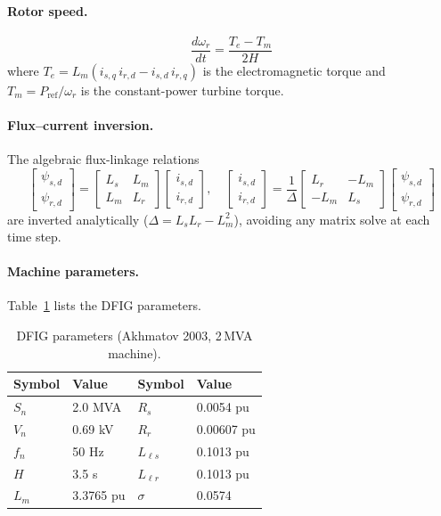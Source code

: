 \documentclass[11pt,a4paper]{article}
\begin{document}
\paragraph{Rotor speed.}
\begin{equation}
  \frac{d\omega_r}{dt} = \frac{T_e - T_m}{2H}
  \label{eq:wr}
\end{equation}
where $T_e = L_m(i_{s,q}\,i_{r,d} - i_{s,d}\,i_{r,q})$ is the
electromagnetic torque and $T_m = P_\text{ref}/\omega_r$ is the
constant-power turbine torque.

\paragraph{Flux–current inversion.}
The algebraic flux-linkage relations
\begin{equation}
  \begin{bmatrix}\psi_{s,d}\\\psi_{r,d}\end{bmatrix}
  = \begin{bmatrix}L_s & L_m\\ L_m & L_r\end{bmatrix}
  \begin{bmatrix}i_{s,d}\\i_{r,d}\end{bmatrix},
  \quad
  \begin{bmatrix}i_{s,d}\\i_{r,d}\end{bmatrix}
  = \frac{1}{\Delta}
  \begin{bmatrix}L_r & -L_m\\ -L_m & L_s\end{bmatrix}
  \begin{bmatrix}\psi_{s,d}\\\psi_{r,d}\end{bmatrix}
  \label{eq:flux_inv}
\end{equation}
are inverted analytically ($\Delta = L_s L_r - L_m^2$), avoiding
any matrix solve at each time step.

\paragraph{Machine parameters.}
Table~\ref{tab:params} lists the DFIG parameters.

\begin{table}[H]
  \centering
  \caption{DFIG parameters (Akhmatov 2003, 2\,MVA machine).}
  \label{tab:params}
  \begin{tabular}{llll}
    \toprule
    Symbol & Value & Symbol & Value \\
    \midrule
    $S_n$  & 2.0 MVA & $R_s$  & 0.0054 pu \\
    $V_n$  & 0.69 kV & $R_r$  & 0.00607 pu \\
    $f_n$  & 50 Hz   & $L_{\ell s}$ & 0.1013 pu \\
    $H$    & 3.5 s   & $L_{\ell r}$ & 0.1013 pu \\
    $L_m$  & 3.3765 pu & $\sigma$ & 0.0574 \\
    \bottomrule
  \end{tabular}
\end{table}
\end{document}
